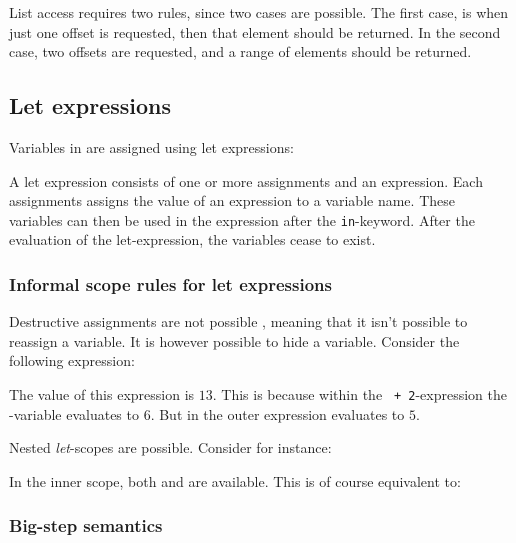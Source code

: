 List access requires two rules, since two cases are possible. The first case, is
when just one offset is requested, then that element should be returned. In the
second case, two offsets are requested, and a range of elements should be
returned.

\subsection{Let expressions}
\label{sec:letexpressions}

Variables in \productname{} are assigned using let expressions:

\begin{ebnf}
\end{ebnf}

A let expression consists of one or more assignments and an expression. Each
assignments assigns the value of an expression to a variable name. These
variables can then be used in the expression after the \texttt{in}-keyword.
After the evaluation of the let-expression, the variables cease to exist.

\subsubsection{Informal scope rules for let expressions}

Destructive assignments are not possible \productname{}, meaning that it isn't
possible to reassign a variable. It is however possible to hide a variable.
Consider the following expression:


The value of this expression is $13$. This is because within the
\texttt{ + 2}-expression the -variable evaluates to $6$.
But in the outer expression  evaluates to $5$.

Nested \emph{let}-scopes are possible. Consider for instance:


In the inner scope, both  and  are available. This is of
course equivalent to:


\subsubsection{Big-step semantics}

